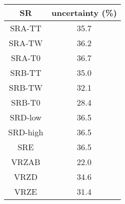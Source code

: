 \begin{tabular}{c||c} \hline\hline
{\bf SR} & {\bf uncertainty (\%)} \\ \hline
SRA-TT & 35.7\\ \hline
SRA-TW & 36.2\\ \hline
SRA-T0 & 36.7\\ \hline
SRB-TT & 35.0\\ \hline
SRB-TW & 32.1\\ \hline
SRB-T0 & 28.4\\ \hline
SRD-low & 36.5\\ \hline
SRD-high & 36.5\\ \hline
SRE & 36.5\\ \hline
VRZAB & 22.0\\ \hline
VRZD & 34.6\\ \hline
VRZE & 31.4\\ \hline
\hline
\end{tabular}
